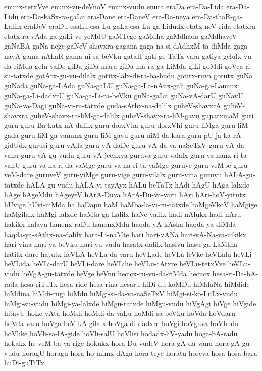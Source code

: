 {enunx-tetxVve
enunx-vu-deVnoV
enunx-vudu
enuta
eraDa
era-Da-Lida
era-Da-Lidu
era-Da-kaSx-ra-gaLu
era-Dane
era-DaneV
era-Da-neya
era-Da-thaR-ga-Lalilx
eraDeV
eraDu
esaLu
esa-Lu-gaLa
esa-Lu-ga-Lidudx
etatx-neV-rida
etatxra
etatx-ra-vAda
ga
gaLi-ve-yeMdU
gaMTege
gaMdha
gaMdhada
gaMdhaveV
gaNaBA
gaNa-nege
gaNeV-shavxra
gagana
gaga-na-si-dAdhxM-ta-diMda
gaga-navA
gama-nAhaR
gama-ni-sa-beVku
gataH
gati-ge-TaTx-vara
gatiya
gelulx-vu-da-riMda
gelu-vaDe
giDa
giDa-mara
giDa-ma-ra-ga-LiMda
giLi
goMdi
goVca-ri-su-tatxde
gotAtx-gu-vu-dilalx
gotitx-lalx-di-ra-ba-hudu
gotitx-ruva
gotutx
guNa
guNada
guNa-ga-LAda
guNa-gaLU
guNa-ga-La-nAnx-gali
guNa-ga-Lanunx
guNa-ga-Li-dadxrU
guNa-ga-Li-ra-beVku
guNa-gaLu
guNa-vA-darU
guNavU
guNa-va-Dagi
guNa-vi-ru-tatxde
guda-sAthx-na-dalilx
guheV-shavxrA
guheV-shavxra
guheV-shavx-ra-liM-ga-dalilx
guheV-shavx-ra-liM-gavu
gupatxmaM
guri
guru
guru-Ba-katx-nA-dalilx
guru-dorxVha
guru-dorxVhi
guru-liMga
guru-liM-gada
guru-liM-ga-vanunx
guru-liM-gavu
guru-niM-da-kara
guru-pU-ja-ka-rA-gidUdx
gurusi
guru-vAda
guru-vA-daDe
guru-vA-da-va-naSeTxV
guru-vA-da-vanu
guru-vA-gu-vudu
guru-vA-jecnxya
guruva
guru-valalx
guru-va-nanx-ri-ta-vanU
guru-va-na-ri-da-vaMge
guru-va-na-ri-ta-vaMge
guruve
guru-veMbe
guru-veM-dare
guruveV
guru-viMge
guru-vige
guru-vilalx
guru-vina
guruvu
hALA-gu-tatxde
hALA-gu-vudu
hALA-yi-tayAyx
hALu-beTaTx
hAdi
hAgU
hAga-lalxde
hAge
hAgeMdu
hAgeyeV
hArA-Duva
hArA-Du-va-varu
hAri
hAri-hoV-yitutx
hUvige
hUvi-niMda
ha
haDapu
haM
haMba-la-vi-ru-tatxde
haMgeVkoV
haMgige
haMgilalx
haMgi-lalxde
haMta-ga-Lalilx
haNe-yalilx
hadi-nAlukx
hadi-nAru
hakikx
halavu
hanenx-raDu
hanonxMdu
haqda-yA-kAsha
haqda-ya-diMda
haqda-ya-sAthx-na-dalilx
hara-Li-naMte
hari
hari-vANa
hari-vA-Na-va-nikikx
hari-vina
hari-ya-beVku
hari-yu-vudu
hasatx-dalilx
hasivu
hasu-ga-LaMtha
hatitx-dare
hatutx
heVLA
heVLa-da-varu
heVLade
heVLa-leVke
heVLalu
heVLi
heVLida
heVLi-darU
heVLi-dare
heVLihe
heVLu-tAtxre
heVLu-tetxVve
heVLu-vudu
heVgA-gu-tatxde
heVge
heVnu
hecicx-ru-vu-da-riMda
hecucx
hesa-ri-Da-bA-rada
hesa-riTuTx
hesa-ride
hesa-rina
hesaru
hiDi-du-koMDu
hiMdaNa
hiMdide
hiMdina
hiMdi-rugi
hiMdu
hiMgi-si-da-va-naSeTxV
hiMgi-si-ko-LuLx-vudu
hiMgi-su-vudu
hiMgi-ya-lalxde
hiMgu-tatxde
hiMgu-vudu
hiVgAgi
hiVge
hiVgide
hitavU
hoLe-vAta
hoMdi
hoMdi-da-vaLu
hoMdi-sa-beVku
hoVda
hoVdaru
hoVda-varu
hoVga-beV-kA-gilalx
hoVga-di-dadxre
hoVgi
hoVguva
hoVhudu
hoVlike
hoVli-sa-lA-gide
hoVli-salU
hoVlisi
hodadx-liV-yadu
hoga-bA-radu
hokakx-he-veM-ba-va-rige
hokukx
hora-Du-vudeV
hora-gA-da-vanu
hora-gA-gu-vudu
horagU
horagu
hora-ho-mimx-dAga
hora-teye
horatu
horeva
hosa
hosa-bara
huDi-guTiTx
}
